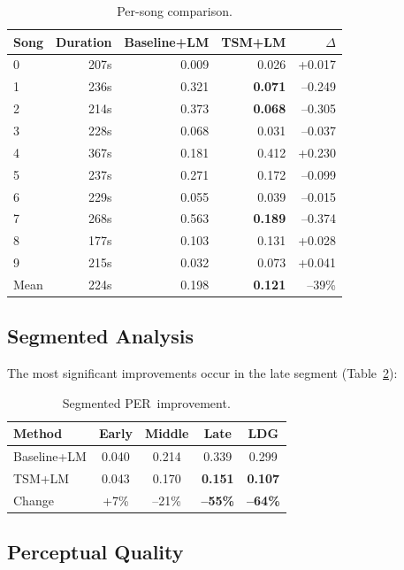 \documentclass[11pt,a4paper]{article}
\newcommand{\per}{PER}
\begin{document}
\begin{table}[h]
\centering
\caption{Per-song comparison.}
\label{tab:persong}
\begin{tabular}{lrrrr}
\toprule
Song & Duration & Baseline+LM & \textbf{TSM+LM} & $\Delta$ \\
\midrule
0 & 207s & 0.009 & 0.026 & +0.017 \\
1 & 236s & 0.321 & \textbf{0.071} & --0.249 \\
2 & 214s & 0.373 & \textbf{0.068} & --0.305 \\
3 & 228s & 0.068 & 0.031 & --0.037 \\
4 & 367s & 0.181 & 0.412 & +0.230 \\
5 & 237s & 0.271 & 0.172 & --0.099 \\
6 & 229s & 0.055 & 0.039 & --0.015 \\
7 & 268s & 0.563 & \textbf{0.189} & --0.374 \\
8 & 177s & 0.103 & 0.131 & +0.028 \\
9 & 215s & 0.032 & 0.073 & +0.041 \\
\midrule
Mean & 224s & 0.198 & \textbf{0.121} & --39\% \\
\bottomrule
\end{tabular}
\end{table}

\subsection{Segmented Analysis}

The most significant improvements occur in the late segment (Table~\ref{tab:seg}):

\begin{table}[h]
\centering
\caption{Segmented \per~improvement.}
\label{tab:seg}
\begin{tabular}{lcccc}
\toprule
Method & Early & Middle & Late & LDG \\
\midrule
Baseline+LM & 0.040 & 0.214 & 0.339 & 0.299 \\
TSM+LM & 0.043 & 0.170 & \textbf{0.151} & \textbf{0.107} \\
Change & +7\% & --21\% & \textbf{--55\%} & \textbf{--64\%} \\
\bottomrule
\end{tabular}
\end{table}

\subsection{Perceptual Quality}
\end{document}
